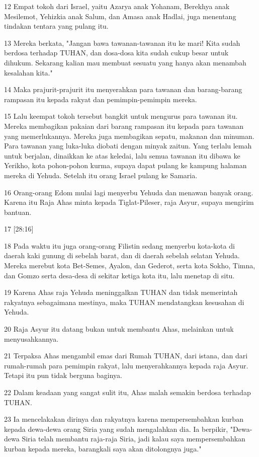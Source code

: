 \par 12 Empat tokoh dari Israel, yaitu Azarya anak Yohanam, Berekhya anak Mesilemot, Yehizkia anak Salum, dan Amasa anak Hadlai, juga menentang tindakan tentara yang pulang itu.
\par 13 Mereka berkata, "Jangan bawa tawanan-tawanan itu ke mari! Kita sudah berdosa terhadap TUHAN, dan dosa-dosa kita sudah cukup besar untuk dihukum. Sekarang kalian mau membuat sesuatu yang hanya akan menambah kesalahan kita."
\par 14 Maka prajurit-prajurit itu menyerahkan para tawanan dan barang-barang rampasan itu kepada rakyat dan pemimpin-pemimpin mereka.
\par 15 Lalu keempat tokoh tersebut bangkit untuk mengurus para tawanan itu. Mereka membagikan pakaian dari barang rampasan itu kepada para tawanan yang memerlukannya. Mereka juga membagikan sepatu, makanan dan minuman. Para tawanan yang luka-luka diobati dengan minyak zaitun. Yang terlalu lemah untuk berjalan, dinaikkan ke atas keledai, lalu semua tawanan itu dibawa ke Yerikho, kota pohon-pohon kurma, supaya dapat pulang ke kampung halaman mereka di Yehuda. Setelah itu orang Israel pulang ke Samaria.
\par 16 Orang-orang Edom mulai lagi menyerbu Yehuda dan menawan banyak orang. Karena itu Raja Ahas minta kepada Tiglat-Pileser, raja Asyur, supaya mengirim bantuan.
\par 17 [28:16]
\par 18 Pada waktu itu juga orang-orang Filistin sedang menyerbu kota-kota di daerah kaki gunung di sebelah barat, dan di daerah sebelah selatan Yehuda. Mereka merebut kota Bet-Semes, Ayalon, dan Gederot, serta kota Sokho, Timna, dan Gomzo serta desa-desa di sekitar ketiga kota itu, lalu menetap di situ.
\par 19 Karena Ahas raja Yehuda meninggalkan TUHAN dan tidak memerintah rakyatnya sebagaimana mestinya, maka TUHAN mendatangkan kesusahan di Yehuda.
\par 20 Raja Asyur itu datang bukan untuk membantu Ahas, melainkan untuk menyusahkannya.
\par 21 Terpaksa Ahas mengambil emas dari Rumah TUHAN, dari istana, dan dari rumah-rumah para pemimpin rakyat, lalu menyerahkannya kepada raja Asyur. Tetapi itu pun tidak berguna baginya.
\par 22 Dalam keadaan yang sangat sulit itu, Ahas malah semakin berdosa terhadap TUHAN.
\par 23 Ia mencelakakan dirinya dan rakyatnya karena mempersembahkan kurban kepada dewa-dewa orang Siria yang sudah mengalahkan dia. Ia berpikir, "Dewa-dewa Siria telah membantu raja-raja Siria, jadi kalau saya mempersembahkan kurban kepada mereka, barangkali saya akan ditolongnya juga."
